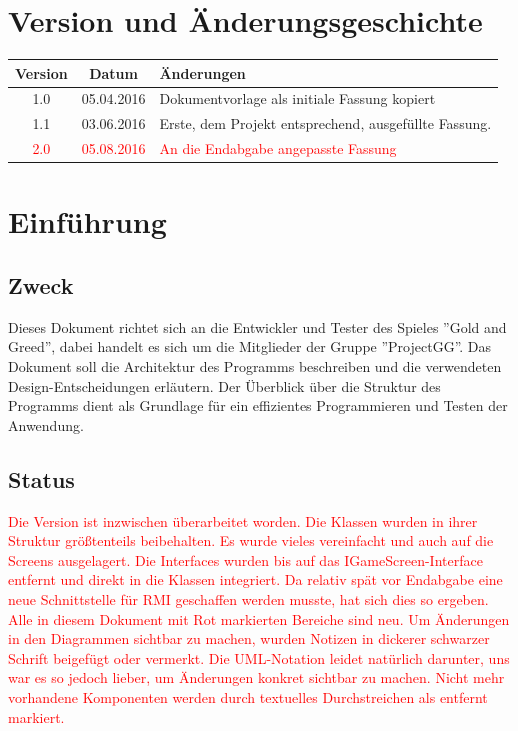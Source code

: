 \documentclass[fontsize=12pt,paper=a4,twoside]{scrartcl}
\begin{document}
\newpage



\section*{Version und Änderungsgeschichte}

\begin{tabular}{ccl}
Version & Datum & Änderungen \\
\hline
1.0 & 05.04.2016 & Dokumentvorlage als initiale Fassung kopiert \\
1.1 & 03.06.2016 & Erste, dem Projekt entsprechend, ausgefüllte Fassung. \\
\textcolor{red}{2.0} &\textcolor{red}{ 05.08.2016} &\textcolor{red}{ An die Endabgabe angepasste Fassung}
\end{tabular}


\section{Einführung}

\subsection{Zweck}

Dieses Dokument richtet sich an die Entwickler und Tester des Spieles ''Gold and Greed'', dabei handelt es sich um die Mitglieder der Gruppe ''ProjectGG''. Das Dokument soll die Architektur des Programms beschreiben und die verwendeten Design-Entscheidungen erläutern. Der Überblick über die Struktur des Programms dient als Grundlage für ein effizientes Programmieren und Testen der Anwendung.

\subsection{Status}

\textcolor{red}{Die Version ist inzwischen überarbeitet worden. Die Klassen wurden in ihrer Struktur größtenteils beibehalten.
Es wurde vieles vereinfacht und auch auf die Screens ausgelagert. Die Interfaces wurden bis auf das IGameScreen-Interface entfernt und direkt in die Klassen integriert. Da relativ spät vor Endabgabe eine neue Schnittstelle für RMI geschaffen werden musste, hat sich dies so ergeben. Alle in diesem Dokument mit Rot markierten Bereiche sind neu. Um Änderungen in den Diagrammen sichtbar zu machen, wurden Notizen in dickerer schwarzer Schrift beigefügt oder vermerkt. Die UML-Notation leidet natürlich darunter, uns war es so jedoch lieber, um Änderungen konkret sichtbar zu machen. Nicht mehr vorhandene Komponenten werden durch textuelles Durchstreichen als entfernt markiert.} 
\end{document}
